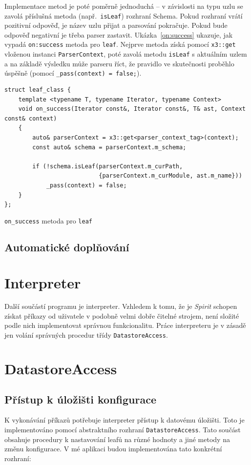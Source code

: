 \documentclass[thesis=B,czech,hidelinks]{FITthesis}[2019/03/06]
\begin{document}
Implementace metod je poté poměrně jednoduchá -- v závislosti na typu uzlu se zavolá příslušná metoda (např.\ \texttt{isLeaf}) rozhraní Schema. Pokud rozhraní vrátí pozitivní odpověď, je název uzlu přijat a parsování pokračuje. Pokud bude odpověď negativní je třeba parser zastavit. Ukázka~\ref{on:success} ukazuje, jak vypadá \verb¨on:success¨ metoda pro \texttt{leaf}. Nejprve metoda získá pomocí \texttt{x3::get} vloženou instanci \texttt{ParserContext}, poté zavolá metodu \texttt{isLeaf} s aktuálním uzlem a na základě výsledku může parseru říct, že pravidlo ve skutečnosti proběhlo úspěšně (pomocí \verb¨_pass(context) = false;¨).

\begin{listing}
\begin{verbatim}
struct leaf_class {
    template <typename T, typename Iterator, typename Context>
    void on_success(Iterator const&, Iterator const&, T& ast, Context const& context)
    {
        auto& parserContext = x3::get<parser_context_tag>(context);
        const auto& schema = parserContext.m_schema;

        if (!schema.isLeaf(parserContext.m_curPath,
                           {parserContext.m_curModule, ast.m_name}))
            _pass(context) = false;
    }
};
\end{verbatim}
\caption{\texttt{on\_success} metoda pro \texttt{leaf}}
\end{listing}


\subsection{Automatické doplňování}\label{completion}

\section{Interpreter}
Další součástí programu je interpreter. Vzhledem k tomu, že je \textit{Spirit} schopen získat příkazy od uživatele v podobně velmi dobře čitelné strojem, není složité podle nich implementovat správnou funkcionalitu. Práce interpreteru je v zásadě jen volání správných procedur třídy \texttt{DatastoreAccess}.

\section{DatastoreAccess}
\subsection{Přístup k úložišti konfigurace}
K vykonávání příkazů potřebuje interpreter přístup k datovému úložišti. Toto je implementováno pomocí abstraktního rozhraní \texttt{DatastoreAccess}. Tato součást obsahuje procedury k nastavování leafů na různé hodnoty a jiné metody na změnu konfigurace. V mé aplikaci budou implementována tato konkrétní rozhraní:
\end{document}
